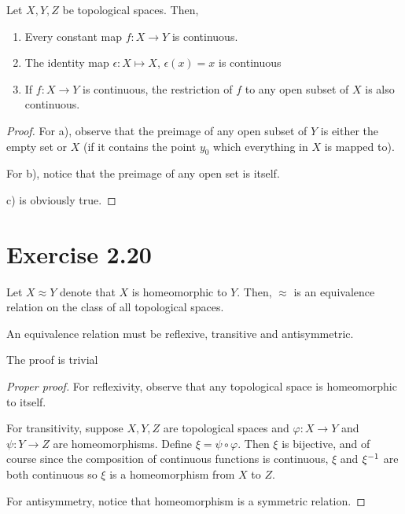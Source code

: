 \documentclass{article}
\begin{document}
\begin{proposition}
\label{book:prop:2.17}
Let $X, Y, Z$ be topological spaces.
Then,
\begin{enumerate}[label=(\alph*)]
    \item Every constant map $f: X \to Y$ is continuous.
    \item The identity map $\epsilon: X \mapsto X$, $\epsilon(x) = x$ is continuous
    \item If $f: X \to Y$ is continuous, the restriction of $f$ to any open subset of $X$ is also continuous.
\end{enumerate}
    
\end{proposition}

\begin{proof}
For a), observe that the preimage of any open subset of $Y$ is
either the empty set or $X$ (if it contains the point $y_0$ which everything in $X$ is mapped to).

For b), notice that the preimage of any open set is itself.

c) is obviously true.
\end{proof}

\section{Exercise 2.20}

\begin{proposition}
    Let $X \approx Y$ denote that $X$ is homeomorphic to $Y$.
    Then, $\approx$ is an equivalence relation on the class of
    all topological spaces.
\end{proposition}
\begin{recall}
    An equivalence relation must be reflexive, transitive
    and antisymmetric.
\end{recall}
\begin{trivialproof}
The proof is trivial
\end{trivialproof}
\begin{proof}[Proper proof]
    For reflexivity, observe that any topological space
    is homeomorphic to itself.

    For transitivity, suppose $X, Y, Z$ are topological spaces
    and $\varphi: X \to Y$ and $\psi: Y \to Z$ are homeomorphisms.  Define $\xi = \psi \circ \varphi$.
    Then $\xi$ is bijective, and of course since
    the composition of continuous functions is continuous,
    $\xi$ and $\xi^{-1}$ are both continuous so $\xi$ is a homeomorphism from $X$ to $Z$.

    For antisymmetry, notice that homeomorphism is a symmetric
    relation. 
\end{proof}
\end{document}

